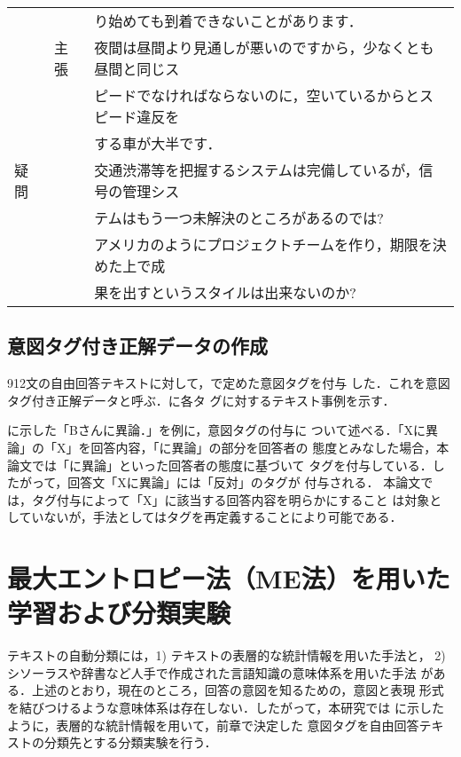\begin{table}[t]
\begin{center}
\begin{tabular}{|l|l|l|}
&     &り始めても到着できないことがあります． \\ \cline{2-3}
&主張 &夜間は昼間より見通しが悪いのですから，少なくとも昼間と同じス\\
&     &ピードでなければならないのに，空いているからとスピード違反を\\
&     &する車が大半です． \\ \hline
疑問
& &交通渋滞等を把握するシステムは完備しているが，信号の管理シス\\
& &テムはもう一つ未解決のところがあるのでは? \\ \cline{3-3}
& &アメリカのようにプロジェクトチームを作り，期限を決めた上で成\\
& &果を出すというスタイルは出来ないのか? \\ \hline
\end{tabular}
\end{center}
\end{table}

\subsection{意図タグ付き正解データの作成}
\label{ssec:answer}
912文の自由回答テキストに対して，で定めた意図タグを付与
した．これを意図タグ付き正解データと呼ぶ．に各タ
グに対するテキスト事例を示す．

に示した「Bさんに異論．」を例に，意図タグの付与に
ついて述べる．「Xに異論」の「X」を回答内容，「に異論」の部分を回答者の
態度とみなした場合，本論文では「に異論」といった回答者の態度に基づいて
タグを付与している．したがって，回答文「Xに異論」には「反対」のタグが
付与される．
本論文では，タグ付与によって「X」に該当する回答内容を明らかにすること
は対象としていないが，手法としてはタグを再定義することにより可能である．

\section{最大エントロピー法（ME法）を用いた学習および分類実験}

テキストの自動分類には，1) テキストの表層的な統計情報を用いた手法と，
2) シソーラスや辞書など人手で作成された言語知識の意味体系を用いた手法
がある．上述のとおり，現在のところ，回答の意図を知るための，意図と表現
形式を結びつけるような意味体系は存在しない．したがって，本研究では
に示したように，表層的な統計情報を用いて，前章で決定した
意図タグを自由回答テキストの分類先とする分類実験を行う．

